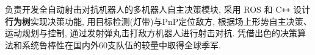 \documentclass{resume}
\begin{document}
\begin{onehalfspacing}
负责开发全自动射击对抗机器人的多机器人自主决策模块, 采用 ROS 和 C\texttt{++} 设计\textbf{行为树}实现决策功能, 用目标检测(灯带)与PnP定位敌方, 根据场上形势自主决策、运动规划与控制, 通过发射弹丸击打敌方机器人进行射击对抗. 凭借出色的决策算法和系统鲁棒性在国内外60支队伍的较量中取得全球季军. 
\end{onehalfspacing}
\end{document}
